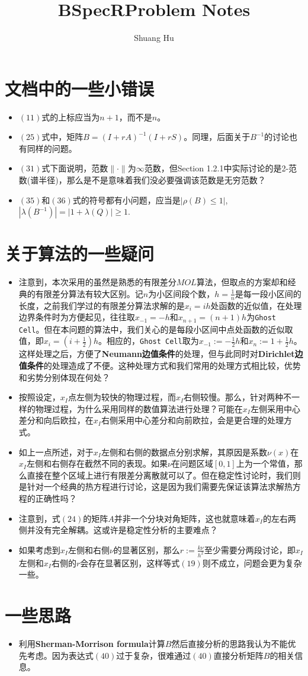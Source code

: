 \documentclass[UTF8]{ctexart}
\title{BSpecRProblem Notes}
\author{Shuang Hu}
\theoremstyle{plain}
\theoremstyle{definition}
\theoremstyle{remark}
\begin{document}
\maketitle
\section{文档中的一些小错误}
\begin{itemize}
    \item $(11)$式的上标应当为$n+1$，而不是$n$。
    \item $(25)$式中，矩阵$B=(I+rA)^{-1}(I+rS)$。同理，后面关于$B^{-1}$的讨论也有同样的问题。
    \item $(31)$式下面说明，范数$\|\cdot\|$为$\infty$范数，但Section 1.2.1中实际讨论的是2-范数(谱半径)，那么是不是意味着我们没必要强调该范数是无穷范数？
    \item $(35)$和$(36)$式的符号都有小问题，应当是$|\rho(B)\le 1|$, $|\lambda(B^{-1})|=|1+\lambda(Q)|\ge 1$.
\end{itemize}
\section{关于算法的一些疑问}
\begin{itemize}
    \item 注意到，本次采用的虽然是熟悉的有限差分$MOL$算法，但取点的方案却和经典的有限差分算法有较大区别。记$n$为小区间段个数，$h=\frac{1}{n}$是每一段小区间的长度，之前我们学过的有限差分算法求解的是$x_{i}=ih$处函数的近似值，在处理边界条件时为方便起见，往往取$x_{-1}=-h$和$x_{n+1}=(n+1)h$为\texttt{Ghost Cell}。但在本问题的算法中，我们关心的是每段小区间中点处函数的近似取值，即$x_{i}=(i+\frac{1}{2})h$。相应的，\texttt{Ghost Cell}取为$x_{-1}:=-\frac{1}{2}h$和$x_{n}:=1+\frac{1}{2}h$。这样处理之后，方便了\textbf{Neumann边值条件}的处理，但与此同时对\textbf{Dirichlet边值条件}的处理造成了不便。这种处理方式和我们常用的处理方式相比较，优势和劣势分别体现在何处？
    \item 按照设定，$x_{I}$点左侧为较快的物理过程，而$x_{I}$右侧较慢。那么，针对两种不一样的物理过程，为什么采用同样的数值算法进行处理？可能在$x_{I}$左侧采用中心差分和向后欧拉，在$x_{I}$右侧采用中心差分和向前欧拉，会是更合理的处理方式。
    \item 如上一点所述，对于$x_{I}$左侧和右侧的数据点分别求解，其原因是系数$\nu(x)$在$x_{I}$左侧和右侧存在截然不同的表现。如果$\nu$在问题区域$[0,1]$上为一个常值，那么直接在整个区域上进行有限差分离散就可以了。但在稳定性讨论时，我们则是针对一个经典的热方程进行讨论，这是因为我们需要先保证该算法求解热方程的正确性吗？
    \item 注意到，式$(24)$的矩阵$A$并非一个分块对角矩阵，这也就意味着$x_{I}$的左右两侧并没有完全解耦。这或许是稳定性分析的主要难点？
    \item 如果考虑到$x_{I}$左侧和右侧$\nu$的显著区别，那么$r:=\frac{k\nu}{h^2}$至少需要分两段讨论，即$x_{I}$左侧和$x_{I}$右侧的$r$会存在显著区别，这样等式$(19)$则不成立，问题会更为复杂一些。
\end{itemize}
\section{一些思路}
\begin{itemize}
    \item 利用\textbf{Sherman-Morrison formula}计算$B$然后直接分析的思路我认为不能优先考虑。因为表达式$(40)$过于复杂，很难通过$(40)$直接分析矩阵$B$的相关信息。
\end{itemize}
\end{document}
